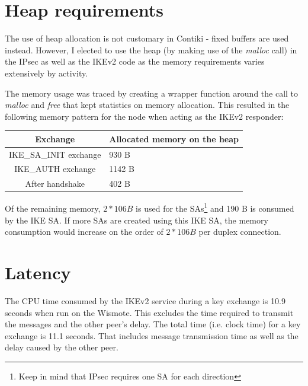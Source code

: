 \documentclass[final,a4paper,twoside,11pt,onecolumn]{report}
\begin{document}
\section{Heap requirements}
The use of heap allocation is not customary in Contiki - fixed buffers are used instead. However, I elected to use the heap (by making use of the \emph{malloc} call) in the IPsec as well as the IKEv2 code as the memory requirements varies extensively by activity.

The memory usage was traced by creating a wrapper function around the call to \emph{malloc} and \emph{free} that kept statistics on memory allocation. This resulted in the following memory pattern for the node when acting as the IKEv2 responder:


\begin{tabular}{c|l}
Exchange                      & Allocated memory on the heap  \\ \hline
IKE\_SA\_INIT exchange      & 930 B                    \\
IKE\_AUTH exchange          & 1142 B                    \\
After handshake            & 402 B
\end{tabular}

Of the remaining memory, $2 * 106 B$ is used for the SAs\footnote{Keep in mind that IPsec requires one SA for each direction} and 190 B is consumed by the IKE SA. If more SAs are created using this IKE SA, the memory consumption would increase on the order of $2 * 106 B$ per duplex connection.
% 

\section{Latency}
The CPU time consumed by the IKEv2 service during a key exchange is 10.9 seconds when run on the Wismote. This excludes the time required to transmit the messages and the other peer's delay. The total time (i.e. clock time) for a key exchange is 11.1 seconds. That includes message transmission time as well as the delay caused by the other peer.
\end{document}
